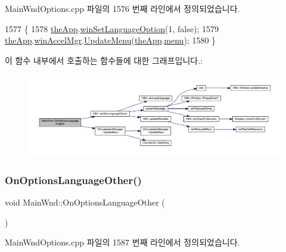 Main\+Wnd\+Options.\+cpp 파일의 1576 번째 라인에서 정의되었습니다.


\begin{DoxyCode}
1577 \{
1578   \mbox{\hyperlink{_v_b_a_8cpp_a8095a9d06b37a7efe3723f3218ad8fb3}{theApp}}.\mbox{\hyperlink{class_v_b_a_ae872998a3ecf3ec0d504378744f441e6}{winSetLanguageOption}}(1, \textcolor{keyword}{false});
1579   \mbox{\hyperlink{_v_b_a_8cpp_a8095a9d06b37a7efe3723f3218ad8fb3}{theApp}}.\mbox{\hyperlink{class_v_b_a_ad7ebce057dbde0ca88cee75e84721a89}{winAccelMgr}}.\mbox{\hyperlink{class_c_accelerator_manager_ac7411d20f413ea0ec3bd65705b564adf}{UpdateMenu}}(\mbox{\hyperlink{_v_b_a_8cpp_a8095a9d06b37a7efe3723f3218ad8fb3}{theApp}}.\mbox{\hyperlink{class_v_b_a_acf9d855b5b959a2df9c6cb21b888366e}{menu}});
1580 \}
\end{DoxyCode}
이 함수 내부에서 호출하는 함수들에 대한 그래프입니다.\+:
\nopagebreak
\begin{figure}[H]
\begin{center}
\leavevmode
\includegraphics[width=350pt]{class_main_wnd_a611b1bde0b2a2ca47ace63d4dec8c27a_cgraph}
\end{center}
\end{figure}
\mbox{\label{class_main_wnd_a49362710ce41db0c6afc8e8bf529ea4d}} 
\subsubsection{\texorpdfstring{On\+Options\+Language\+Other()}{OnOptionsLanguageOther()}}
{\footnotesize\ttfamily void Main\+Wnd\+::\+On\+Options\+Language\+Other (\begin{DoxyParamCaption}{ }\end{DoxyParamCaption})\hspace{0.3cm}{\ttfamily [protected]}}



Main\+Wnd\+Options.\+cpp 파일의 1587 번째 라인에서 정의되었습니다.


